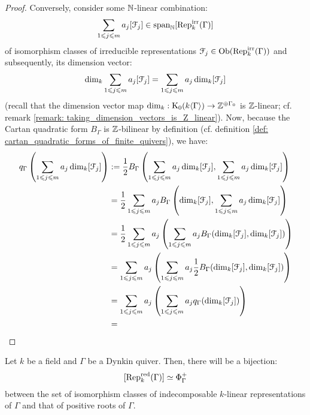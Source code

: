 \begin{proof}
                        Conversely, consider some $\mathbb{N}$-linear combination:
                            $$\sum_{1 \leqslant j \leqslant m} a_j [\mathcal{F}_j] \in \operatorname{span}_{\mathbb{N}} [\mathrm{Rep}_k^{\mathrm{irr}}(\Gamma)]$$
                        of isomorphism classes of irreducible representations $\mathcal{F}_j \in \mathrm{Ob}(\mathrm{Rep}_k^{\mathrm{irr}}(\Gamma))$ and subsequently, its dimension vector:
                            $$\dim_k \sum_{1 \leqslant j \leqslant m} a_j [\mathcal{F}_j] = \sum_{1 \leqslant j \leqslant m} a_j \dim_k [\mathcal{F}_j]$$
                        (recall that the dimension vector map $\dim_k: \mathrm{K}_0(k\langle\Gamma\rangle) \to 
                        \mathbb{Z}^{\oplus \Gamma_0}$ is $\mathbb{Z}$-linear; cf. remark \ref{remark: taking_dimension_vectors_is_Z_linear}). Now, because the Cartan quadratic form $B_{\Gamma}$ is $\mathbb{Z}$-bilinear by definition (cf. definition \ref{def: cartan_quadratic_forms_of_finite_quivers}), we have:
                            $$
                                \begin{aligned}
                                    q_{\Gamma}\left(\sum_{1 \leqslant j \leqslant m} a_j \dim_k [\mathcal{F}_j]\right) & := \frac12 B_{\Gamma}\left(\sum_{1 \leqslant j \leqslant m} a_j \dim_k [\mathcal{F}_j], \sum_{1 \leqslant j \leqslant m} a_j \dim_k [\mathcal{F}_j]\right)
                                    \\
                                    & = \frac12 \sum_{1 \leqslant j \leqslant m} a_j B_{\Gamma}\left(\dim_k [\mathcal{F}_j], \sum_{1 \leqslant j \leqslant m} a_j \dim_k [\mathcal{F}_j]\right)
                                    \\
                                    & = \frac12 \sum_{1 \leqslant j \leqslant m} a_j \left( \sum_{1 \leqslant j \leqslant m} a_j B_{\Gamma}(\dim_k [\mathcal{F}_j], \dim_k [\mathcal{F}_j]) \right)
                                    \\
                                    & = \sum_{1 \leqslant j \leqslant m} a_j \left( \sum_{1 \leqslant j \leqslant m} a_j \frac12 B_{\Gamma}(\dim_k [\mathcal{F}_j], \dim_k [\mathcal{F}_j]) \right)
                                    \\
                                    & = \sum_{1 \leqslant j \leqslant m} a_j \left( \sum_{1 \leqslant j \leqslant m} a_j q_{\Gamma}(\dim_k [\mathcal{F}_j]) \right)
                                    \\
                                    & = 
                                \end{aligned}    
                            $$
                    \end{proof}
                \begin{corollary} \label{coro: indecomposable_representations_of_dynkin_quivers_are_labelled_by_positive_roots}
                    Let $k$ be a field and $\Gamma$ be a Dynkin quiver. Then, there will be a bijection:
                        $$[\mathrm{Rep}_k^{\mathrm{red}}(\Gamma)] \simeq \Phi_{\Gamma}^+$$
                    between the set of isomorphism classes of indecomposable $k$-linear representations of $\Gamma$ and that of positive roots of $\Gamma$.
                \end{corollary}
            
